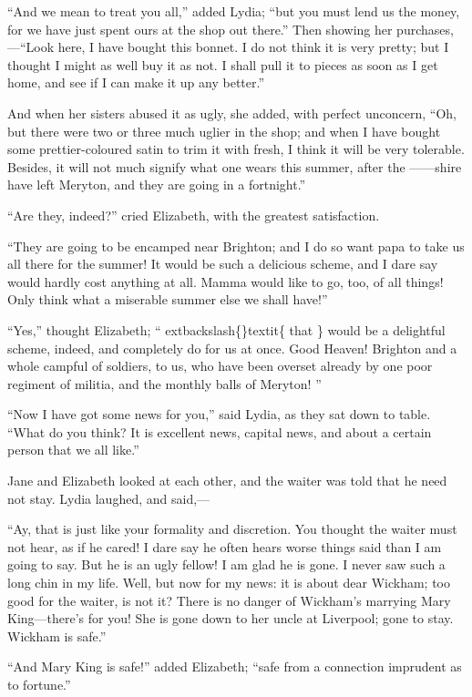 \documentclass[10pt]{book}
\begin{document}
   “And we mean to treat you all,” added Lydia; “but you must lend us the
money, for we have just spent ours at the shop out there.” Then showing
her purchases,—“Look here, I have bought this bonnet. I do not think it
is very pretty; but I thought I might as well buy it as not. I shall
pull it to pieces as soon as I get home, and see if I can make it up any
better.”
  

   And when her sisters abused it as ugly, she added, with perfect
unconcern, “Oh, but there were two or three much uglier in the shop; and
when I have bought some prettier-coloured satin to trim it with fresh, I
think it will be very tolerable. Besides, it will not much signify what
one wears this summer, after the ——shire have left Meryton, and they
are going in a fortnight.”
  

   “Are they, indeed?” cried Elizabeth, with the greatest satisfaction.
  

   “They are going to be encamped near Brighton; and I do so want papa to
take us all there for the summer! It would be such a delicious scheme,
and I dare say would hardly cost anything at all. Mamma would like to
go, too, of all things! Only think what a miserable summer else we shall
have!”
  

   “Yes,” thought Elizabeth; “
   	extbackslash\{\}textit\{
    that
   \}
   would be a delightful scheme, indeed,
and completely do for us at once. Good Heaven! Brighton and a whole
campful of soldiers, to us, who have been overset already by one poor
regiment of militia, and the monthly balls of Meryton!
   ”
  

   “Now I have got some news for you,” said Lydia, as they sat down to
table. “What do you think? It is excellent news, capital news, and about
a certain person that we all like.”
  

   Jane and Elizabeth looked at each other, and the waiter was told that he
need not stay. Lydia laughed, and said,—
  

   “Ay, that is just like your formality and discretion. You thought the
waiter must not hear, as if he cared! I dare say he often hears worse
things said than I am going to say. But he is an ugly fellow! I am glad
he is gone. I never saw such a long chin in my life. Well, but now for
my news: it is about dear Wickham; too good for the waiter, is not it?
There is no danger of Wickham’s marrying Mary King—there’s for you! She
is gone down to her uncle at Liverpool; gone to stay. Wickham is safe.”
  

   “And Mary King is safe!” added Elizabeth; “safe from a connection
imprudent as to fortune.”
  
\end{document}
